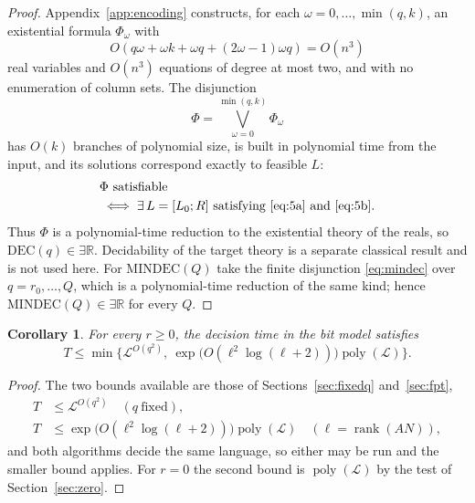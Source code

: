 \documentclass[journal]{IEEEtran}
\theoremstyle{plainn}
\newtheorem{cor}[thm]{Corollary}
\theoremstyle{remark}
\begin{document}
\begin{proof}
Appendix~\ref{app:encoding} constructs, for each $\omega=0,\dots,\min(q,k)$, an existential formula $\Phi_\omega$ with
\begin{equation*}
O(q\omega+\omega k+\omega q+(2\omega-1)\omega q)=O(n^3)
\end{equation*}
real variables and $O(n^3)$ equations of degree at most two, and with no enumeration of column sets. The disjunction
\begin{equation}\label{eq:existsr-disj}
\Phi=\bigvee_{\omega=0}^{\min(q,k)}\Phi_\omega
\end{equation}
has $O(k)$ branches of polynomial size, is built in polynomial time from the input, and its solutions correspond exactly to feasible $L$:
\begin{equation*}
\begin{aligned}
&\Phi\ \text{satisfiable}\\
&\iff\exists\,L=[L_0;R]\ \text{satisfying}\ \eqref{eq:5a}\ \text{and}\ \eqref{eq:5b}.
\end{aligned}
\end{equation*}
Thus $\Phi$ is a polynomial-time reduction to the existential theory of the reals, so $\mathrm{DEC}(q)\in\exists\mathbb R$. Decidability of the target theory is a separate classical result and is not used here. For $\mathrm{MINDEC}(Q)$ take the finite disjunction \eqref{eq:mindec} over $q=r_0,\dots,Q$, which is a polynomial-time reduction of the same kind; hence $\mathrm{MINDEC}(Q)\in\exists\mathbb R$ for every $Q$.
\end{proof}

\begin{cor}\label{cor:time}
For every $r\ge0$, the decision time in the bit model satisfies
\begin{equation*}
T\le\min\bigl\{\mathcal L^{O(q^2)},\
\exp\bigl(O(\ell^2\log(\ell+2))\bigr)\operatorname{poly}(\mathcal L)\bigr\}.
\end{equation*}
\end{cor}

\begin{proof}
The two bounds available are those of Sections~\ref{sec:fixedq} and~\ref{sec:fpt},
\begin{equation*}
\begin{aligned}
T&\le\mathcal L^{O(q^2)}\quad(q\ \text{fixed}),\\
T&\le\exp\bigl(O(\ell^2\log(\ell+2))\bigr)\operatorname{poly}(\mathcal L)
\quad(\ell=\operatorname{rank}(AN)),
\end{aligned}
\end{equation*}
and both algorithms decide the same language, so either may be run and the smaller bound applies.
For $r=0$ the second bound is $\operatorname{poly}(\mathcal L)$ by the test of
Section~\ref{sec:zero}.
\end{proof}
\end{document}
